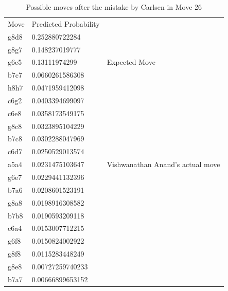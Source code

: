 \begin{table}[H]
\centering
\begin{tabular}{@{}lll@{}}
\cmidrule(r){1-2}
Move & Predicted Probability &                                  \\ 
\cmidrule(r){1-2}
g8d8 & 0.252880722284        &                                  \\
g8g7 & 0.148237019777        &                                  \\
g6e5 & 0.13111974299         & Expected Move                    \\
b7c7 & 0.0660261586308       &                                  \\
h8h7 & 0.0471959412098       &                                  \\
c6g2 & 0.0403394699097       &                                  \\
c6e8 & 0.0358173549175       &                                  \\
g8c8 & 0.0323895104229       &                                  \\
b7c8 & 0.0302288047969       &                                  \\
c6d7 & 0.0250529013574       &                                  \\
a5a4 & 0.0231475103647       & Vishwanathan Anand's actual move \\
g6e7 & 0.0229441132396       &                                  \\
b7a6 & 0.0208601523191       &                                  \\
g8a8 & 0.0198916308582       &                                  \\
b7b8 & 0.0190593209118       &                                  \\
c6a4 & 0.0153007712215       &                                  \\
g6f8 & 0.0150824002922       &                                  \\
g8f8 & 0.0115283448249       &                                  \\
g8e8 & 0.00727259740233      &                                  \\
b7a7 & 0.00666899653152      &                                  \\ 
\cmidrule(r){1-2}
\end{tabular}
\caption{Possible moves after the mistake by Carlsen in Move 26}
\label{table:vishy-carlsen}
\end{table}

